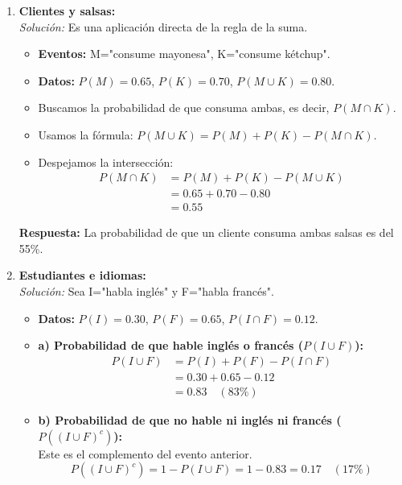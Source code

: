 \documentclass[12pt, letterpaper]{article}
\begin{document}
\begin{enumerate}
	\item \textbf{Clientes y salsas:} \\
	      \textit{Solución:} Es una aplicación directa de la regla de la suma.
	      \begin{itemize}
		      \item \textbf{Eventos:} M="consume mayonesa", K="consume kétchup".
		      \item \textbf{Datos:} $P(M)=0.65$, $P(K)=0.70$, $P(M \cup K)=0.80$.
		      \item Buscamos la probabilidad de que consuma ambas, es decir, $P(M \cap K)$.
		      \item Usamos la fórmula: $P(M \cup K) = P(M) + P(K) - P(M \cap K)$.
		      \item Despejamos la intersección:
		            \begin{align*}
			            P(M \cap K) & = P(M) + P(K) - P(M \cup K) \\
			                        & = 0.65 + 0.70 - 0.80        \\
			                        & = 0.55
		            \end{align*}
	      \end{itemize}
	      \textbf{Respuesta:} La probabilidad de que un cliente consuma ambas salsas es del 55\%.

	\item \textbf{Estudiantes e idiomas:} \\
	      \textit{Solución:} Sea I="habla inglés" y F="habla francés".
	      \begin{itemize}
		      \item \textbf{Datos:} $P(I)=0.30$, $P(F)=0.65$, $P(I \cap F)=0.12$.
		      \item \textbf{a) Probabilidad de que hable inglés o francés ($P(I \cup F)$):}
		            \begin{align*}
			            P(I \cup F) & = P(I) + P(F) - P(I \cap F) \\
			                        & = 0.30 + 0.65 - 0.12        \\
			                        & = 0.83 \quad (83\%)
		            \end{align*}
		      \item \textbf{b) Probabilidad de que no hable ni inglés ni francés ($P((I \cup F)^c)$):} \\
		            Este es el complemento del evento anterior.
		            \[ P((I \cup F)^c) = 1 - P(I \cup F) = 1 - 0.83 = 0.17 \quad (17\%) \]
	      \end{itemize}


\end{enumerate}
\end{document}
